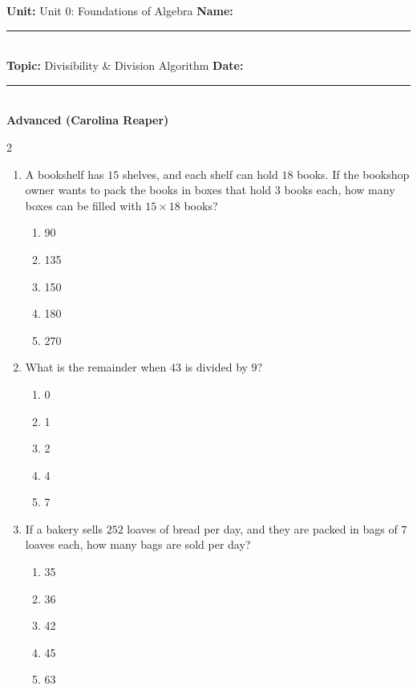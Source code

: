 \documentclass[10pt]{article}
\begin{document}
\enlargethispage{2.5cm}

\begin{tcolorbox}[colback=mainblue!5, colframe=mainblue, sharp corners, boxrule=0.5pt]
    \small \textbf{Unit:} Unit 0: Foundations of Algebra \hfill \textbf{Name:} \rule{3cm}{0.4pt} \\
    \small \textbf{Topic:} Divisibility & Division Algorithm \hfill \textbf{Date:} \rule{2cm}{0.4pt} \\
    \centering \textbf{\large Advanced (Carolina Reaper)}
\end{tcolorbox}

\vspace{0.2cm}

\begin{multicols}{2}
\begin{enumerate}[label=\textbf{Q\arabic*.}, leftmargin=*, itemsep=6pt, parsep=0pt]

  \item \small A bookshelf has $15$ shelves, and each shelf can hold $18$ books. If the bookshop owner wants to pack the books in boxes that hold $3$ books each, how many boxes can be filled with $15 \times 18$ books?
  \begin{enumerate}[label=(\Alph*), leftmargin=0.6cm, nosep, itemsep=2pt]
    \item 90
    \item 135
    \item 150
    \item 180
    \item 270
  \end{enumerate}

  \item \small What is the remainder when $43$ is divided by $9$?
  \begin{enumerate}[label=(\Alph*), leftmargin=0.6cm, nosep, itemsep=2pt]
    \item 0
    \item 1
    \item 2
    \item 4
    \item 7
  \end{enumerate}

  \item \small If a bakery sells $252$ loaves of bread per day, and they are packed in bags of $7$ loaves each, how many bags are sold per day?
  \begin{enumerate}[label=(\Alph*), leftmargin=0.6cm, nosep, itemsep=2pt]
    \item 35
    \item 36
    \item 42
    \item 45
    \item 63
  \end{enumerate}


\end{enumerate}
\end{multicols}
\end{document}
